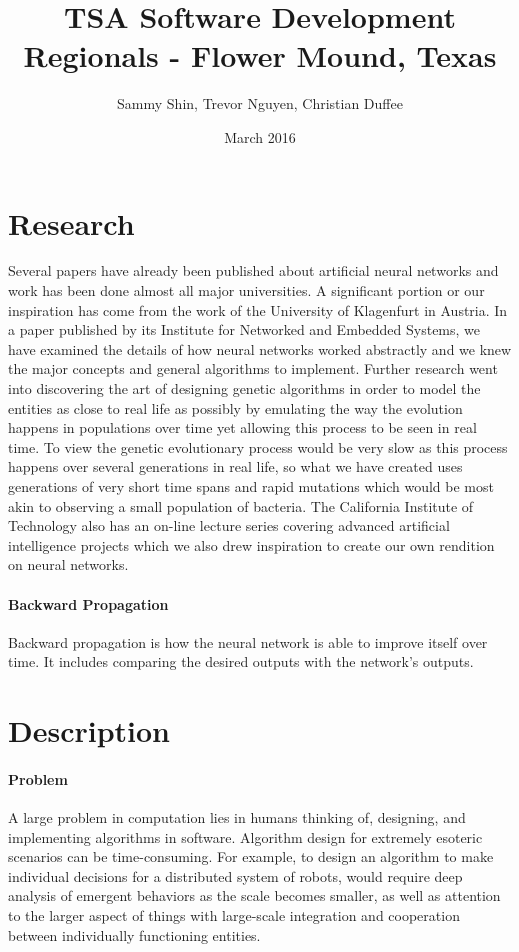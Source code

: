 \documentclass[letterpaper, 10pt]{article}
\title{TSA Software Development \\ Regionals - Flower Mound, Texas}
\author{Sammy Shin, Trevor Nguyen, Christian Duffee}
\date{March 2016}
\begin{document}
\maketitle

\cleardoublepage

\tableofcontents

\cleardoublepage
\section{Research}	
	Several papers have already been published about artificial neural networks and work has been done almost all major universities. A significant portion or our inspiration has come from the work of the University of Klagenfurt in Austria. In a paper published by its Institute for Networked and Embedded Systems, we have examined the details of how neural networks worked abstractly and we knew the major concepts and general algorithms to implement. Further research went into discovering the art of designing genetic algorithms in order to model the entities as close to real life as possibly by emulating the way the evolution happens in populations over time yet allowing this process to be seen in real time. To view the genetic evolutionary process would be very slow as this process happens over several generations in real life, so what we have created uses generations of very short time spans and rapid mutations which would be most akin to observing a small population of bacteria. The California Institute of Technology also has an on-line lecture series covering advanced artificial intelligence projects which we also drew inspiration to create our own rendition on neural networks.
	
	
	\paragraph{Backward Propagation}
	Backward propagation is how the neural network is able to improve itself over time. It includes comparing the desired outputs with the network's outputs.
\cleardoublepage
\section{Description}
	\paragraph{Problem} A large problem in computation lies in humans thinking of, designing, and implementing algorithms in software. Algorithm design for extremely esoteric scenarios can be time-consuming. For example, to design an algorithm to make individual decisions for a distributed system of robots, would require deep analysis of emergent behaviors as the scale becomes smaller, as well as attention to the larger aspect of things with large-scale integration and cooperation between individually functioning entities.
\end{document}
